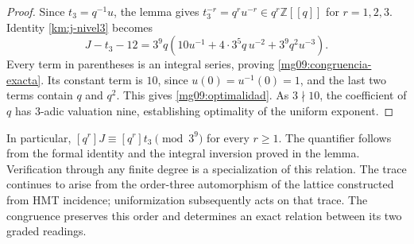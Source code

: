 \begin{proof}
Since \(t_3=q^{-1}u\), the lemma gives
\(t_3^{-r}=q^ru^{-r}\in q^r\mathbb Z[[q]]\) for
\(r=1,2,3\). Identity \eqref{km:j-nivel3} becomes
\begin{equation}
 J-t_3-12
 =3^9q\left(10u^{-1}+4\cdot3^5q\,u^{-2}
                         +3^9q^2u^{-3}\right).
 \label{mg09:factorizacion}
\end{equation}
Every term in parentheses is an integral series, proving
\eqref{mg09:congruencia-exacta}. Its constant term is \(10\),
since \(u(0)=u^{-1}(0)=1\), and the last two terms contain
\(q\) and \(q^2\). This gives \eqref{mg09:optimalidad}. As
\(3\nmid10\), the coefficient of \(q\) has \(3\)-adic valuation
nine, establishing optimality of the uniform exponent.
\end{proof}

In particular, \([q^r]J\equiv[q^r]t_3\pmod{3^9}\) for every
\(r\geq1\). The quantifier follows from the formal identity and
the integral inversion proved in the lemma. Verification through any
finite degree is a specialization of this relation. The trace continues
to arise from the order-three automorphism of the lattice constructed
from HMT incidence; uniformization subsequently acts on that trace.
The congruence preserves this order and determines an exact relation
between its two graded readings.
